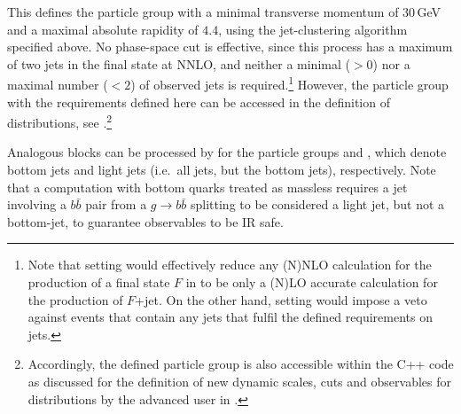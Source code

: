 \documentclass[english,11pt]{article}
\begin{document}
This defines the particle group  with a minimal transverse momentum of $30$\,GeV and a maximal absolute rapidity of $4.4$, 
using the jet-clustering algorithm specified above. No phase-space cut is effective, since this process has a maximum of two jets 
in the final state at NNLO, and neither a minimal ($>0$) nor a maximal number ($<2$) of observed jets is required.\footnote{Note that setting  would effectively reduce any (N)NLO calculation for the production of a final state $F$ in \Matrix{} to be only a (N)LO
accurate calculation for the production of $F$+jet. On the other hand, setting  would impose a veto against events that contain any jets that fulfil the defined requirements on jets.}
 However, the particle group  with 
the requirements defined here can be accessed in the definition of distributions, see .\footnote{Accordingly, the defined particle group 
is also accessible within the C++ code as discussed for the definition of new dynamic scales, cuts and observables for distributions by the advanced user in .}

Analogous blocks can be processed by \Matrix{} for the particle groups  and , 
which denote bottom jets and light jets (i.e.\ all jets, but the bottom jets), 
respectively. Note that a computation with bottom quarks treated as massless requires a jet 
involving a $b\bar{b}$ pair from a $g\to b\bar{b}$ splitting to be considered a light jet, 
but not a bottom-jet, to guarantee observables to be IR safe.
\end{document}
